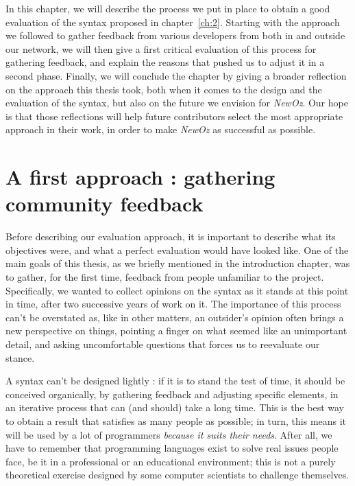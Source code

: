 
In this chapter, we will describe the process we put in place to obtain a good evaluation of the syntax proposed in chapter~\ref{ch:2}.
Starting with the approach we followed to gather feedback from various developers from both in and outside our network,
we will then give a first critical evaluation of this process for gathering feedback, and explain the reasons that pushed us to adjust it in a second phase.
Finally, we will conclude the chapter by giving a broader reflection on the approach this thesis took, both when it comes to the design and the evaluation of the syntax, but also on the future we envision for \textit{NewOz}.
Our hope is that those reflections will help future contributors select the most appropriate approach in their work, in order to make \textit{NewOz} as successful as possible.

\section{A first approach : gathering community feedback}\label{sec:ch4-GitHub}
Before describing our evaluation approach, it is important to describe what its objectives were, and what a perfect evaluation would have looked like.\newline
One of the main goals of this thesis, as we briefly mentioned in the introduction chapter, was to gather, for the first time, feedback from people unfamiliar to the project.
Specifically, we wanted to collect opinions on the syntax as it stands at this point in time, after two successive years of work on it.
The importance of this process can't be overstated as, like in other matters, an outsider's opinion often brings a new perspective on things, pointing a finger on what seemed like an unimportant detail, and asking uncomfortable questions that forces us to reevaluate our stance.\newline

A syntax can't be designed lightly : if it is to stand the test of time, it should be conceived organically, by gathering feedback and adjusting specific elements, in an iterative process that can (and should) take a long time.
This is the best way to obtain a result that satisfies as many people as possible;
in turn, this means it will be used by a lot of programmers \emph{because it suits their needs}.
After all, we have to remember that programming languages exist to solve real issues people face, be it in a professional or an educational environment;
this is not a purely theoretical exercise designed by some computer scientists to challenge themselves.\newline

